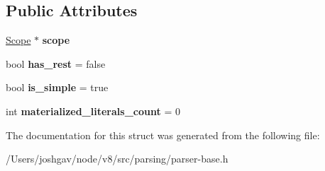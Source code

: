 \subsection*{Public Attributes}
\begin{DoxyCompactItemize}
\item 
\hyperlink{classv8_1_1internal_1_1_scope}{Scope} $\ast$ {\bfseries scope}\hypertarget{structv8_1_1internal_1_1_formal_parameters_base_a383508ce316e6ff49287df422f791f3b}{}\label{structv8_1_1internal_1_1_formal_parameters_base_a383508ce316e6ff49287df422f791f3b}

\item 
bool {\bfseries has\+\_\+rest} = false\hypertarget{structv8_1_1internal_1_1_formal_parameters_base_ad07160002fd880fa04a61da8d177742f}{}\label{structv8_1_1internal_1_1_formal_parameters_base_ad07160002fd880fa04a61da8d177742f}

\item 
bool {\bfseries is\+\_\+simple} = true\hypertarget{structv8_1_1internal_1_1_formal_parameters_base_a6452dec4905dce7bbd0c0bf454e93129}{}\label{structv8_1_1internal_1_1_formal_parameters_base_a6452dec4905dce7bbd0c0bf454e93129}

\item 
int {\bfseries materialized\+\_\+literals\+\_\+count} = 0\hypertarget{structv8_1_1internal_1_1_formal_parameters_base_ad9bbc1f989ba874684400ff764a95d1e}{}\label{structv8_1_1internal_1_1_formal_parameters_base_ad9bbc1f989ba874684400ff764a95d1e}

\end{DoxyCompactItemize}


The documentation for this struct was generated from the following file\+:\begin{DoxyCompactItemize}
\item 
/\+Users/joshgav/node/v8/src/parsing/parser-\/base.\+h\end{DoxyCompactItemize}
